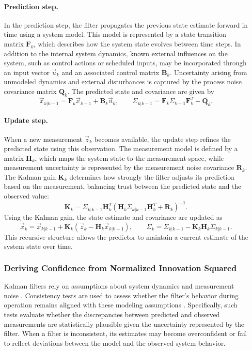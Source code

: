 \paragraph{Prediction step.}
In the prediction step, the filter propagates the previous state estimate forward in time using a system model. This model is represented by a state transition matrix $\mathbf{F}_k$, which describes how the system state evolves between time steps. In addition to the internal system dynamics, known external influences on the system, such as control actions or scheduled inputs, may be incorporated through an input vector $\vec{u}_k$ and an associated control matrix $\mathbf{B}_k$. Uncertainty arising from unmodeled dynamics and external disturbances is captured by the process noise covariance matrix $\mathbf{Q}_k$. The predicted state and covariance are given by
\[
\vec{x}_{k|k-1} = \mathbf{F}_k \vec{x}_{k-1} + \mathbf{B}_k \vec{u}_k,
\qquad
\Sigma_{k|k-1} = \mathbf{F}_k \Sigma_{k-1} \mathbf{F}_k^{T} + \mathbf{Q}_k.
\]

\paragraph{Update step.}
When a new measurement $\vec{z}_k$ becomes available, the update step refines the predicted state using this observation. The measurement model is defined by a matrix $\mathbf{H}_k$, which maps the system state to the measurement space, while measurement uncertainty is represented by the measurement noise covariance $\mathbf{R}_k$. The Kalman gain $\mathbf{K}_k$ determines how strongly the filter adjusts its prediction based on the measurement, balancing trust between the predicted state and the observed value:
\[
\mathbf{K}_k = \Sigma_{k|k-1} \mathbf{H}_k^{T}
\left( \mathbf{H}_k \Sigma_{k|k-1} \mathbf{H}_k^{T} + \mathbf{R}_k \right)^{-1}.
\]
Using the Kalman gain, the state estimate and covariance are updated as
\[
\vec{x}_k = \vec{x}_{k|k-1} + \mathbf{K}_k \left( \vec{z}_k - \mathbf{H}_k \vec{x}_{k|k-1} \right),
\qquad
\Sigma_k = \Sigma_{k|k-1} - \mathbf{K}_k \mathbf{H}_k \Sigma_{k|k-1}.
\]
This recursive structure allows the predictor to maintain a current estimate of the system state over time.

\subsubsection{Deriving Confidence from Normalized Innovation Squared}
Kalman filters rely on assumptions about system dynamics and measurement noise \cite{simon2006optimal}. Consistency tests are used to assess whether the filter’s behavior during operation remains aligned with these modeling assumptions \cite{gamse2014statistical}. Specifically, such tests evaluate whether the discrepancies between predicted and observed measurements are statistically plausible given the uncertainty represented by the filter. When a filter is inconsistent, its estimates may become overconfident or fail to reflect deviations between the model and the observed system behavior.

